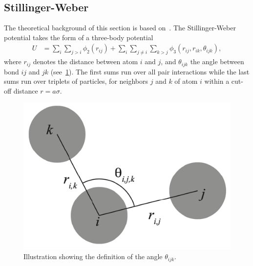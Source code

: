 \subsection{Stillinger-Weber}\label{sec:wb}
The theoretical background of this section is based on~\cite{docs_lammps_sw, PhysRevB.31.5262}. The Stillinger-Weber potential takes the form of a three-body potential
\begin{align*}
  U &=\sum_i \sum_{j>i} \phi_2(r_{i j})+\sum_i \sum_{j \neq i} \sum_{k>j} \phi_3(r_{ij}, r_{ik}, \theta_{ijk}),
\end{align*}
where $r_{ij}$ denotes the distance between atom $i$ and $j$, and $\theta_{ijk}$
the angle between bond $ij$ and $jk$ (see~\cref{fig:three_body_angle}). The first sums run over all pair interactions while the last sums run over triplets of particles, for neighbors $j$ and $k$ of atom $i$ within a cut-off distance $r = a\sigma$. 

\begin{figure}[!htb]
  \centering
  \includegraphics[width=0.35\linewidth]{figures/theory/three_body_angle.pdf}
  \caption{Illustration showing the definition of the angle $\theta_{ijk}$.}
  \label{fig:three_body_angle}
\end{figure}


